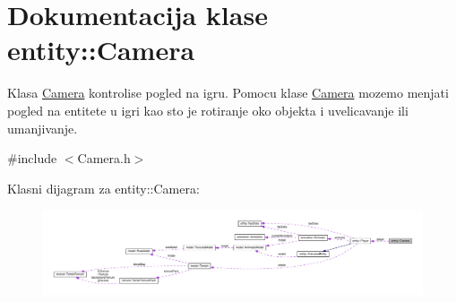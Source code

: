 \hypertarget{classentity_1_1Camera}{}\section{Dokumentacija klase entity\+:\+:Camera}
\label{classentity_1_1Camera}


Klasa \hyperlink{classentity_1_1Camera}{Camera} kontrolise pogled na igru. Pomocu klase \hyperlink{classentity_1_1Camera}{Camera} mozemo menjati pogled na entitete u igri kao sto je rotiranje oko objekta i uvelicavanje ili umanjivanje.  




{\ttfamily \#include $<$Camera.\+h$>$}



Klasni dijagram za entity\+:\+:Camera\+:
\nopagebreak
\begin{figure}[H]
\begin{center}
\leavevmode
\includegraphics[width=350pt]{classentity_1_1Camera__coll__graph}
\end{center}
\end{figure}

